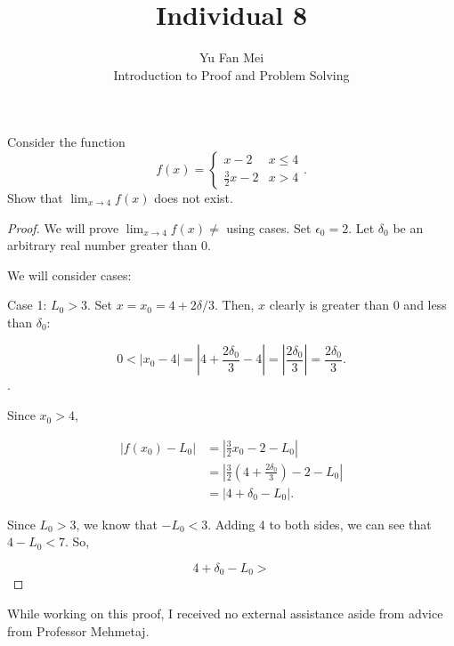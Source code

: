 \documentclass[12pt]{article}
\newenvironment{problem}[2][Problem]{\begin{trivlist}
\item[\hskip \labelsep {\bfseries #1}\hskip \labelsep {\bfseries #2.}]}{\end{trivlist}}
\begin{document}

\title{Individual 8}%
\author{Yu Fan Mei\\
	Introduction to Proof and Problem Solving} %

\maketitle

\begin{problem}{1}
    Consider the function
    \begin{equation*}
    f(x) =
    \begin{cases}
    x - 2 & x \leq 4\\
    \frac{3}{2}x - 2 & x > 4
    \end{cases}.
    \end{equation*}
    Show that $\lim_{x\to 4} f(x)$ does not exist.
\end{problem}

\begin{proof}
    We will prove $\lim_{x\to 4} f(x)\neq $ using cases. Set $\epsilon_0 = 2$. Let $\delta_0$ be an arbitrary real number greater than 0.

    We will consider cases:

    \noindent Case 1: $L_0 > 3$. Set $x = x_0 = 4 + 2\delta/3$. Then, $x$ clearly is greater than 0 and less than $\delta_0$:

    $$0 < |x_0 - 4| = |4 + \frac{2\delta_0}{3} - 4| = |\frac{2\delta_0}{3}| = \frac{2\delta_0}{3}.$$.

    Since $x_0 > 4$, 

    \begin{align*}
        |f(x_0) - L_0| & = |\frac{3}{2}x_0 - 2 - L_0| \\
        & = |\frac{3}{2}(4 + \frac{2\delta_0}{3}) - 2 - L_0| \\
        & = |4 + \delta_0 - L_0|.
    \end{align*}

    Since $L_0 > 3$, we know that $-L_0 < 3$. Adding 4 to both sides, we can see that $4-L_0 < 7$. So,

    \[4 + \delta_0 - L_0 >  \]



\end{proof}

\noindent While working on this proof, I received no external assistance aside from advice from Professor Mehmetaj.
\end{document}
